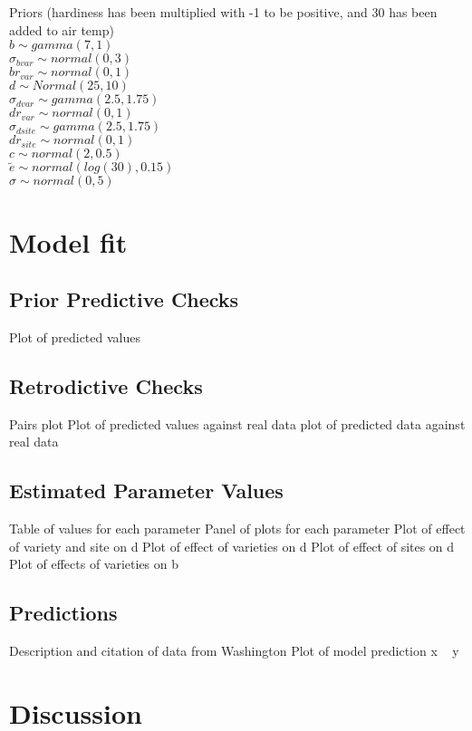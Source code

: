 \documentclass[11pt,letter]{article}
\begin{document}
Priors (hardiness has been multiplied with -1 to be positive, and 30 has been added to air temp)\\
	$b \sim gamma(7,1)$\\
	$\sigma_{bvar} \sim normal(0,3)$ \\
	$br_{var} \sim normal(0,1)$ \\
	$d \sim Normal(25, 10)$ \\
	$\sigma_{dvar} \sim gamma(2.5,1.75)$ \\
	$dr_{var} \sim normal(0,1)$ \\
	$\sigma_{dsite} \sim gamma(2.5,1.75)$ \\
	$dr_{site} \sim normal(0,1)$ \\
	$c \sim normal(2,0.5)$\\
	$\tilde{e} \sim normal(log(30), 0.15)$ \\
	$\sigma \sim normal(0,5)$\\



\section{Model fit}
\subsection{Prior Predictive Checks}
Plot of predicted values
\subsection{Retrodictive Checks}
Pairs plot
Plot of predicted values against real data
plot of predicted data against real data

\subsection{Estimated Parameter Values}
Table of values for each parameter 
Panel of plots for each parameter 
Plot of effect of variety and site on d
Plot of effect of varieties on d
Plot of effect of sites on d
Plot of effects of varieties on b

\subsection{Predictions}
Description and citation of data from Washington 
Plot of model prediction x ~ y 


\section{Discussion}
\end{document}
